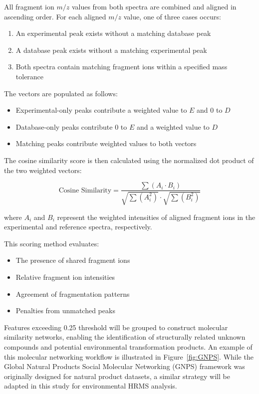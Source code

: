 \documentclass[11pt]{article}
\begin{document}
\begin{doublespace}
        All fragment ion \(m/z\) values from both spectra are combined and aligned in ascending order. 
        For each aligned \(m/z\) value, one of three cases occurs:
        \begin{enumerate}
            \item An experimental peak exists without a matching database peak
            \item A database peak exists without a matching experimental peak
            \item Both spectra contain matching fragment ions within a specified mass tolerance
        \end{enumerate}

        The vectors are populated as follows:
        \begin{itemize}
            \item Experimental-only peaks contribute a weighted value to \(E\) and 0 to \(D\)
            \item Database-only peaks contribute 0 to \(E\) and a weighted value to \(D\)
            \item Matching peaks contribute weighted values to both vectors
        \end{itemize}

        The cosine similarity score is then calculated using the normalized dot product of the two weighted vectors:

        \[
        \text{Cosine Similarity} =
        \frac{\sum (A_i \cdot B_i)}
        {\sqrt{\sum (A_i^2)} \cdot \sqrt{\sum (B_i^2)}}
        \]

        where \(A_i\) and \(B_i\) represent the weighted intensities of aligned fragment ions in the experimental and reference spectra, respectively.

        This scoring method evaluates:
        \begin{itemize}
            \item The presence of shared fragment ions
            \item Relative fragment ion intensities
            \item Agreement of fragmentation patterns
            \item Penalties from unmatched peaks
        \end{itemize}

        Features exceeding 0.25 threshold will be grouped to construct molecular similarity networks, enabling the identification of structurally related unknown compounds and potential environmental transformation products. 
        An example of this molecular networking workflow is illustrated in Figure~\ref{fig:GNPS}. While the Global Natural Products Social Molecular Networking (GNPS) framework was originally designed for natural product datasets, a similar strategy will be adapted in this study for environmental HRMS analysis.


\end{doublespace}
\end{document}
